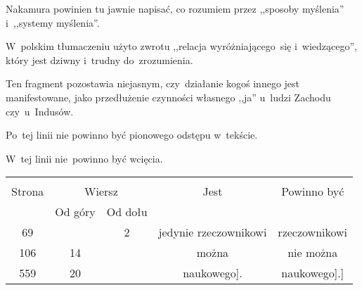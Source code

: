 \documentclass[a4paper,11pt]{article}
\begin{document}
\vspace{\spaceTwo}







\start {} Nakamura powinien tu jawnie napisać, co rozumiem przez
,,sposoby myślenia'' i~,,systemy myślenia''.

\vspace{\spaceFour}


\start {} W~polskim tłumaczeniu użyto zwrotu ,,relacja
wyróżniającego~się i~wiedzącego'', który jest dziwny i~trudny
do~zrozumienia.

\vspace{\spaceFour}


\start {} Ten fragment pozostawia niejasnym,
czy~działanie kogoś innego jest manifestowane, jako przedłużenie
czynności własnego ,,ja'' u~ludzi Zachodu czy~u~Indusów.

\vspace{\spaceFour}


\start {} Po~tej linii nie powinno być pionowego odstępu
w~tekście.

\vspace{\spaceFour}


\start {} W~tej linii nie~powinno być wcięcia.


\begin{center}
  \begin{tabular}{|c|c|c|c|c|}
    \hline
    & \multicolumn{2}{c|}{} & & \\
    Strona & \multicolumn{2}{c|}{Wiersz} & Jest
                              & Powinno być \\ \cline{2-3}
    & Od góry & Od dołu & & \\
    \hline
    69  & &  2 & jedynie rzeczownikowi & rzeczownikowi \\
    106 & 14 & & można & nie można \\
    559 & 20 & & naukowego]. & naukowego].] \\
    \hline
  \end{tabular}
\end{center}
\end{document}

